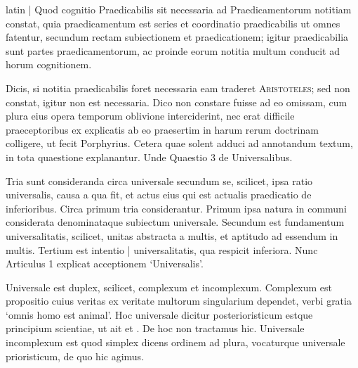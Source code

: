\begin{otherlanguage*}{latin}
\pstart
 \textnormal{|} Quod cognitio Praedicabilis sit necessaria ad Praedicamentorum notitiam constat, quia praedicamentum est series et coordinatio praedicabilis ut omnes fatentur, secundum rectam subiectionem et praedicationem; igitur praedicabilia sunt partes praedicamentorum, ac proinde eorum notitia multum conducit ad horum cognitionem. 
\pend

\pstart
 Dicis, si notitia praedicabilis foret necessaria eam traderet \textsc{Aristoteles}; sed non constat, igitur non est necessaria. Dico non constare fuisse ad eo omissam, cum plura eius opera temporum oblivione interciderint, nec erat difficile praeceptoribus ex explicatis ab eo praesertim in  harum rerum doctrinam colligere, ut fecit Porphyrius. Cetera quae solent adduci ad annotandum textum, in tota quaestione explanantur. Unde Quaestio 3 de Universalibus. 
\pend

        \pstart
        \pend
      
\pstart
 Tria sunt consideranda circa universale secundum se, scilicet, ipsa ratio universalis, causa a qua fit, et actus eius qui est actualis praedicatio de inferioribus. Circa primum tria considerantur. Primum ipsa natura in communi considerata denominataque subiectum universale. Secundum est fundamentum universalitatis, scilicet, unitas abstracta a multis, et aptitudo ad essendum in multis. Tertium est intentio \textnormal{|} universalitatis, qua respicit inferiora. Nunc Articulus 1 explicat acceptionem `Universalis'. 
\pend

        \pstart
        \pend
      
\pstart
 Universale est duplex, scilicet, complexum et incomplexum. Complexum est propositio cuius veritas ex veritate multorum singularium dependet, verbi gratia `omnis homo est animal'. Hoc universale dicitur posterioristicum estque principium scientiae, ut ait  et . De hoc non tractamus hic. Universale incomplexum est quod simplex dicens ordinem ad plura, vocaturque universale prioristicum, de quo hic agimus. 
\pend


\end{otherlanguage*}
